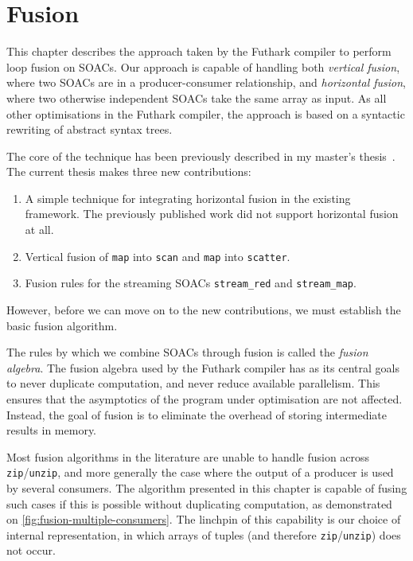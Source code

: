 \chapter{Fusion}
\label{chap:fusion}

This chapter describes the approach taken by the Futhark compiler to
perform loop fusion on SOACs.  Our approach is capable of handling
both \textit{vertical fusion}, where two SOACs are in a
producer-consumer relationship, and \textit{horizontal fusion}, where
two otherwise independent SOACs take the same array as input.  As all
other optimisations in the Futhark compiler, the approach is based on
a syntactic rewriting of abstract syntax trees.

The core of the technique has been previously described in my master's
thesis~\cite{henriksen2014exploiting}.  The current thesis makes three
new contributions:

\begin{enumerate}
\item A simple technique for integrating horizontal fusion in the
  existing framework.  The previously published work did not support
  horizontal fusion at all.
\item Vertical fusion of \lstinline{map} into \lstinline{scan} and
  \lstinline{map} into \lstinline{scatter}.
\item Fusion rules for the streaming SOACs \lstinline{stream_red} and
  \lstinline{stream_map}.
\end{enumerate}

However, before we can move on to the new contributions, we must
establish the basic fusion algorithm.

The rules by which we combine SOACs through fusion is called the
\textit{fusion algebra}.  The fusion algebra used by the Futhark
compiler has as its central goals to never duplicate computation, and
never reduce available parallelism.  This ensures that the asymptotics
of the program under optimisation are not affected.  Instead, the goal
of fusion is to eliminate the overhead of storing intermediate results
in memory.

Most fusion algorithms in the literature are unable to handle fusion
across \lstinline{zip}/\lstinline{unzip}, and more generally the case
where the output of a producer is used by several consumers.  The
algorithm presented in this chapter is capable of fusing such cases
if this is possible without duplicating computation, as demonstrated on
\cref{fig:fusion-multiple-consumers}.  The linchpin of this capability
is our choice of internal representation, in which arrays of tuples
(and therefore \lstinline{zip}/\lstinline{unzip}) does not occur.

